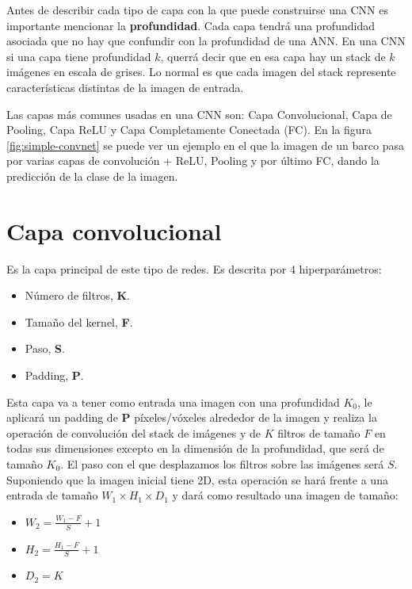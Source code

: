 Antes de describir cada tipo de capa con la que puede construirse una CNN es importante mencionar la \textbf{profundidad}. Cada capa tendrá una profundidad asociada que no hay que confundir con la profundidad de una ANN. En una CNN si una capa tiene profundidad $k$, querrá decir que en esa capa hay un stack de $k$ imágenes en escala de grises. Lo normal es que cada imagen del stack represente características distintas de la imagen de entrada.

Las capas más comunes usadas en una CNN son: Capa Convolucional, Capa de Pooling, Capa ReLU y Capa Completamente Conectada (FC). En la figura \ref{fig:simple-convnet} \cite{missinglink2020} se puede ver un ejemplo en el que la imagen de un barco pasa por varias capas de convolución + ReLU, Pooling y por último FC, dando la predicción de la clase de la imagen.


\section{Capa convolucional}

Es la capa principal de este tipo de redes. Es descrita por 4 hiperparámetros:

\begin{itemize}
\item Número de filtros, \textbf{K}.
\item Tamaño del kernel, \textbf{F}.
\item Paso, \textbf{S}.
\item Padding, \textbf{P}.
\end{itemize}

Esta capa va a tener como entrada una imagen con una profundidad $K_0$, le aplicará un padding de \textbf{P} píxeles/vóxeles alrededor de la imagen y realiza la operación de convolución del stack de imágenes y de $K$ filtros de tamaño $F$ en todas sus dimensiones excepto en la dimensión de la profundidad, que será de tamaño $K_0$. El paso con el que desplazamos los filtros sobre las imágenes será $S$. Suponiendo que la imagen inicial tiene 2D, esta operación se hará frente a una entrada de tamaño $W_1 \times H_1 \times D_1$ y dará como resultado una imagen de tamaño:

\begin{itemize}
\item $W_2 = \frac{W_1 - F}{S} + 1$
\item $H_2 = \frac{H_1 - F}{S} + 1$
\item $D_2 = K$
\end{itemize}

